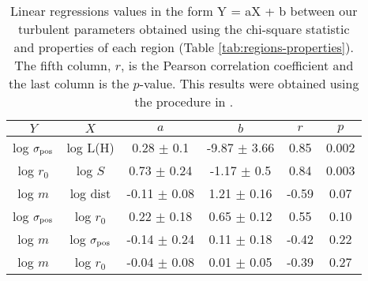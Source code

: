\begin{table*}
\begin{center}
\caption{Linear regressions values in the form Y = aX + b between our turbulent parameters obtained using the chi-square statistic and properties of each region (Table \ref{tab:regions-properties}). The fifth column, $r$, is the Pearson correlation coefficient and the last column is the $p$-value. This results were obtained using the procedure in \citet{2007ApJ...665.1489K}.}
\begin{tabular}{cccccc}
\hline
            $Y$ &                   $X$ &                 $a$ &                 $b$ &       $r$ &      $p$ \\
\hline
 log $\sigma_{\mathrm{pos}}$ &            log L(H) &   0.28 $\pm$ 0.1 &  -9.87 $\pm$ 3.66 &   0.85 &  0.002 \\
    log $r_0$ &             log $S$ &   0.73 $\pm$ 0.24 &  -1.17 $\pm$ 0.5 &   0.84 &  0.003 \\
      log $m$ &            log dist &  -0.11 $\pm$ 0.08 &   1.21 $\pm$ 0.16 &  -0.59 &   0.07 \\
 log $\sigma_{\mathrm{pos}}$ &         log $r_{0}$ &   0.22 $\pm$ 0.18 &   0.65 $\pm$ 0.12 &   0.55 &  0.10 \\
      log $m$ &        log $\sigma_{\mathrm{pos}}$ &  -0.14 $\pm$ 0.24 &   0.11 $\pm$ 0.18 &  -0.42 &  0.22 \\
      log $m$ &         log $r_{0}$ &  -0.04 $\pm$ 0.08 &   0.01 $\pm$ 0.05 &  -0.39 &   0.27 \\
\bottomrule
\end{tabular}\label{tab:RestStats}
\end{center}
\end{table*}


